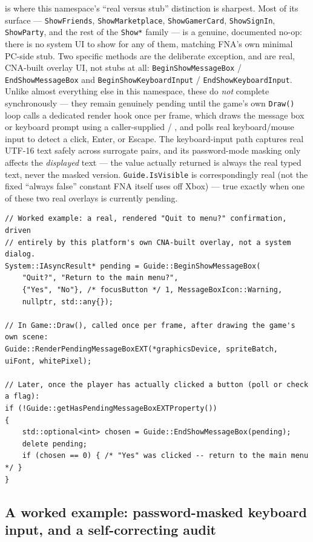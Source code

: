  is where this namespace's ``real versus stub'' distinction is sharpest. Most
of its surface --- \texttt{ShowFriends}, \texttt{ShowMarketplace}, \texttt{ShowGamerCard},
\texttt{ShowSignIn}, \texttt{ShowParty}, and the rest of the \texttt{Show*} family --- is a
genuine, documented no-op: there is no system UI to show for any of them, matching FNA's own
minimal PC-side stub. Two specific methods are the deliberate exception, and are real, CNA-built
overlay UI, not stubs at all: \texttt{BeginShowMessageBox} / \texttt{EndShowMessageBox} and
\texttt{BeginShowKeyboardInput} / \texttt{EndShowKeyboardInput}. Unlike almost everything else
in this namespace, these do \emph{not} complete synchronously --- they remain genuinely
pending until the game's own \texttt{Draw()} loop calls a dedicated render hook once per
frame, which draws the message box or keyboard prompt using a caller-supplied
 / , and polls real keyboard/mouse input to detect a
click, Enter, or Escape. The keyboard-input path captures real UTF-16 text safely across
surrogate pairs, and its password-mode masking only affects the \emph{displayed} text --- the
value actually returned is always the real typed text, never the masked version.
\texttt{Guide.IsVisible} is correspondingly real (not the fixed ``always false'' constant FNA
itself uses off Xbox) --- true exactly when one of these two real overlays is currently
pending.

\begin{lstlisting}
// Worked example: a real, rendered "Quit to menu?" confirmation, driven
// entirely by this platform's own CNA-built overlay, not a system dialog.
System::IAsyncResult* pending = Guide::BeginShowMessageBox(
    "Quit?", "Return to the main menu?",
    {"Yes", "No"}, /* focusButton */ 1, MessageBoxIcon::Warning,
    nullptr, std::any{});

// In Game::Draw(), called once per frame, after drawing the game's own scene:
Guide::RenderPendingMessageBoxEXT(*graphicsDevice, spriteBatch, uiFont, whitePixel);

// Later, once the player has actually clicked a button (poll or check a flag):
if (!Guide::getHasPendingMessageBoxEXTProperty())
{
    std::optional<int> chosen = Guide::EndShowMessageBox(pending);
    delete pending;
    if (chosen == 0) { /* "Yes" was clicked -- return to the main menu */ }
}
\end{lstlisting}

\subsection{A worked example: password-masked keyboard input, and a self-correcting audit}

